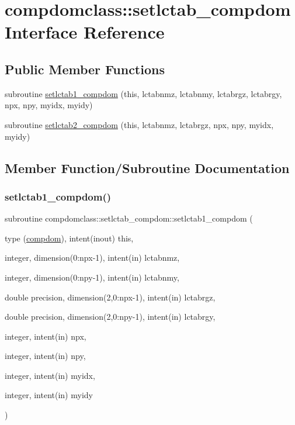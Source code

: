 \hypertarget{interfacecompdomclass_1_1setlctab__compdom}{}\section{compdomclass\+::setlctab\+\_\+compdom Interface Reference}
\label{interfacecompdomclass_1_1setlctab__compdom}
\subsection*{Public Member Functions}
\begin{DoxyCompactItemize}
\item 
subroutine \mbox{\hyperlink{interfacecompdomclass_1_1setlctab__compdom_ab34e29cb92c5b9c09bdbb2e1c52db058}{setlctab1\+\_\+compdom}} (this, lctabnmz, lctabnmy, lctabrgz, lctabrgy, npx, npy, myidx, myidy)
\item 
subroutine \mbox{\hyperlink{interfacecompdomclass_1_1setlctab__compdom_a3951c1216f28b4bb9abce40a1358195c}{setlctab2\+\_\+compdom}} (this, lctabnmz, lctabrgz, npx, npy, myidx, myidy)
\end{DoxyCompactItemize}


\subsection{Member Function/\+Subroutine Documentation}
\mbox{\label{interfacecompdomclass_1_1setlctab__compdom_ab34e29cb92c5b9c09bdbb2e1c52db058}} 
\subsubsection{\texorpdfstring{setlctab1\_compdom()}{setlctab1\_compdom()}}
{\footnotesize\ttfamily subroutine compdomclass\+::setlctab\+\_\+compdom\+::setlctab1\+\_\+compdom (\begin{DoxyParamCaption}\item[{type (\mbox{\hyperlink{namespacecompdomclass_structcompdomclass_1_1compdom}{compdom}}), intent(inout)}]{this,  }\item[{integer, dimension(0\+:npx-\/1), intent(in)}]{lctabnmz,  }\item[{integer, dimension(0\+:npy-\/1), intent(in)}]{lctabnmy,  }\item[{double precision, dimension(2,0\+:npx-\/1), intent(in)}]{lctabrgz,  }\item[{double precision, dimension(2,0\+:npy-\/1), intent(in)}]{lctabrgy,  }\item[{integer, intent(in)}]{npx,  }\item[{integer, intent(in)}]{npy,  }\item[{integer, intent(in)}]{myidx,  }\item[{integer, intent(in)}]{myidy }\end{DoxyParamCaption})}

